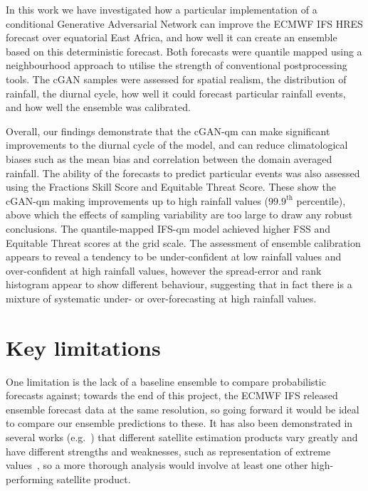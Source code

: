\documentclass[../main.tex]{subfiles}
\begin{document}
In this work we have investigated how a particular implementation of a conditional Generative Adversarial Network can improve the ECMWF IFS HRES forecast over equatorial East Africa, and how well it can create an ensemble based on this deterministic forecast. Both forecasts were quantile mapped using a neighbourhood approach to utilise the strength of conventional postprocessing tools. The cGAN samples were assessed for spatial realism, the distribution of rainfall, the diurnal cycle, how well it could forecast particular rainfall events, and how well the ensemble was calibrated.

Overall, our findings demonstrate that the 
cGAN-qm can make significant improvements to the diurnal cycle of the model, and can reduce climatological biases such as the mean bias and correlation between the domain averaged rainfall. The ability of the forecasts to predict particular events was also assessed using the Fractions Skill Score and Equitable Threat Score. These show the cGAN-qm making improvements up to high rainfall values ($99.9^{\text{th}}$ percentile), above which the effects of sampling variability are too large to draw any robust conclusions. The quantile-mapped IFS-qm model achieved higher FSS and Equitable Threat scores at the grid scale. The assessment of ensemble calibration appears to reveal a tendency to be under-confident at low rainfall values and over-confident at high rainfall values, however the spread-error and rank histogram appear to show different behaviour, suggesting that in fact there is a mixture of systematic under- or over-forecasting at high rainfall values.


\section{Key limitations}

One limitation is the lack of a baseline ensemble to compare probabilistic forecasts against; towards the end of this project, the ECMWF IFS released ensemble forecast data at the same resolution, so going forward it would be ideal to compare our ensemble predictions to these. It has also been demonstrated in several works (e.g.~\cite{ageet_validation_2022}) that different satellite estimation products vary greatly and have different strengths and weaknesses, such as representation of extreme values~\citep{chapman_climate_2022}, so a more thorough analysis would involve at least one other high-performing satellite product.
 
\end{document}
